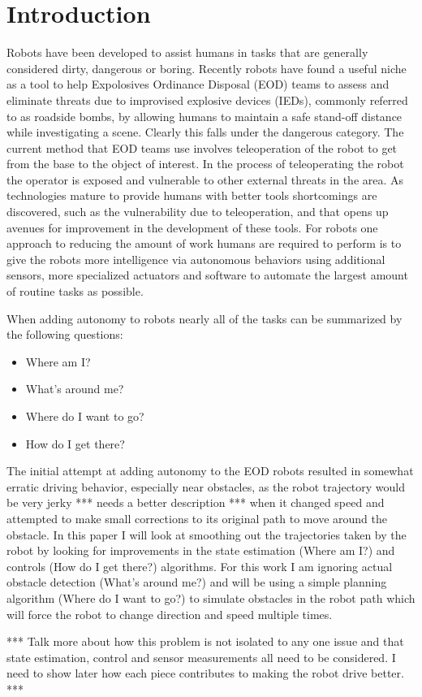 \chapter{Introduction}
Robots have been developed to assist humans in tasks that are generally considered dirty, dangerous or boring. Recently robots have found a useful niche as a tool to help Expolosives Ordinance Disposal (EOD) teams to assess and eliminate threats due to improvised explosive devices (IEDs), commonly referred to as roadside bombs, by allowing humans to maintain a safe stand-off distance while investigating a scene. Clearly this falls under the dangerous category. The current method that EOD teams use involves teleoperation of the robot to get from the base to the object of interest. In the process of teleoperating the robot the operator is exposed and vulnerable to other external threats in the area. As technologies mature to provide humans with better tools shortcomings are discovered, such as the vulnerability due to teleoperation, and that opens up avenues for improvement in the development of these tools. For robots one approach to reducing the amount of work humans are required to perform is to give the robots more intelligence via autonomous behaviors using additional sensors, more specialized actuators and software to automate the largest amount of routine tasks as possible.

When adding autonomy to robots nearly all of the tasks can be summarized by the following questions:
\begin{itemize}
\item Where am I?
\item What's around me?
\item Where do I want to go?
\item How do I get there?
\end{itemize}

The initial attempt at adding autonomy to the EOD robots resulted in somewhat erratic driving behavior, especially near obstacles, as the robot trajectory would be very jerky *** needs a better description *** when it changed speed and attempted to make small corrections to its original path to move around the obstacle. In this paper I will look at smoothing out the trajectories taken by the robot by looking for improvements in the state estimation (Where am I?) and controls (How do I get there?) algorithms. For this work I am ignoring actual obstacle detection (What's around me?) and will be using a simple planning algorithm (Where do I want to go?) to simulate obstacles in the robot path which will force the robot to change direction and speed multiple times.

*** Talk more about how this problem is not isolated to any one issue and that state estimation, control and sensor measurements all need to be considered. I need to show later how each piece contributes to making the robot drive better. ***
